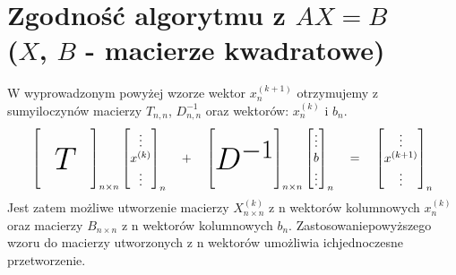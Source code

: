 \documentclass[a4paper,margin=1.54cm]{article}
\begin{document}
\section{Zgodność algorytmu z $AX = B$\\($X$, $B$ - macierze kwadratowe)}
W wyprowadzonym powyżej wzorze wektor $x^{(k+1)}_n$ otrzymujemy z sumy\linebreak iloczynów macierzy $T_{n,n}$, $D^{-1}_{n,n}$ oraz wektorów: $x^{(k)}_n$ i $b_n$.
\[
\begin{bmatrix}
    \qquad\qquad \\
    \\
    \raisebox{0pt}[0pt][0pt]{\Huge $T$} \\
    \\
\end{bmatrix}_{n\times n}
\begin{bmatrix}
 \vdots\\
 x^{(k)}\\
 \vdots
\end{bmatrix}_{n}
\quad + \quad
\begin{bmatrix}
    \qquad\qquad \\
    \\
    \raisebox{0pt}[0pt][0pt]{\Huge $D^{-1}$} \\
    \\
\end{bmatrix}_{n\times n}
\begin{bmatrix}
 \vdots\\
 b\\
 \vdots
\end{bmatrix}_{n}
\quad = \quad
\begin{bmatrix}
 \vdots\\
 x^{(k+1)}\\
 \vdots
\end{bmatrix}_{n}
 \]
 Jest zatem możliwe utworzenie macierzy $X^{(k)}_{n\times n}$ z n wektorów kolumnowych $x^{(k)}_n$ oraz macierzy $B_{n\times n}$ z n wektorów kolumnowych $b_n$. Zastosowanie\linebreak powyższego wzoru do macierzy utworzonych z n wektorów umożliwia ich\linebreak jednoczesne przetworzenie.
\end{document}
